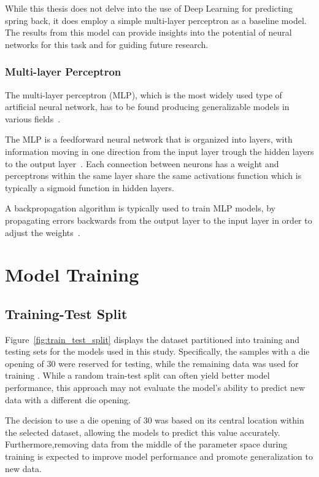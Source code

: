 While this thesis does not delve into the use of Deep Learning for predicting spring
back, it does employ a simple multi-layer perceptron as a baseline model.
The results from this model can provide insights into the potential of neural networks for this
task and for guiding future research.

\subsubsection{Multi-layer Perceptron}
The multi-layer perceptron (MLP), which is the most widely used type of artificial
neural network, has to be found producing generalizable models in various fields~\cite[
    p.451]{taud2018multilayer}.

The MLP is a feedforward neural network that is organized into layers, with information
moving in one direction from the input layer trough the hidden layers to the output
layer~\cite{bishop1995neural}.
Each connection between neurons has a weight and perceptrons within the same layer
share the same activations function which is typically a sigmoid function in hidden
layers.

A backpropagation algorithm is typically used to train \ac{MLP} models, by
propagating errors backwards from the output layer to the input layer in order to adjust
the weights~\cite[p. 454]{taud2018multilayer}.

\section{Model Training}\label{sec:model-training}

\subsection{Training-Test Split}\label{subsec:training-test-split}
Figure~\ref{fig:train_test_split} displays the dataset partitioned into training and
testing sets for the models used in this study.
Specifically, the samples with a die
opening of 30 were reserved for testing, while the remaining data was used for training .
While a random train-test split can often yield better model performance, this
approach may not evaluate the model's ability to predict new data with a different die
opening.

The decision to use a die opening of 30 was based on its central location within the
selected dataset, allowing the models to predict this value accurately.
Furthermore,removing data from the middle of the parameter space during training is
expected to improve model performance and promote generalization to new data.

